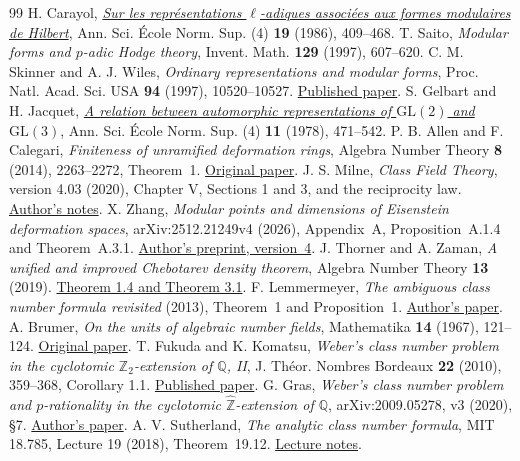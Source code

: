 \documentclass[a4paper,11pt]{article}
\theoremstyle{definition}
\theoremstyle{remark}
\numberwithin{equation}{section}
\begin{document}
\begin{thebibliography}{99}
 H. Carayol, \href{https://www.numdam.org/articles/10.24033/asens.1512/}{\emph{Sur les repr\'esentations \(\ell\)-adiques associ\'ees aux formes modulaires de Hilbert}}, Ann. Sci. \'Ecole Norm. Sup. (4) \textbf{19} (1986), 409--468. T. Saito, \emph{Modular forms and \(p\)-adic Hodge theory}, Invent. Math. \textbf{129} (1997), 607--620.
 C. M. Skinner and A. J. Wiles, \emph{Ordinary representations and modular forms}, Proc. Natl. Acad. Sci. USA \textbf{94} (1997), 10520--10527. \href{https://doi.org/10.1073/pnas.94.20.10520}{Published paper}.
 S. Gelbart and H. Jacquet, \href{https://www.numdam.org/item/ASENS_1978_4_11_4_471_0/}{\emph{A relation between automorphic representations of \(\mathrm{GL}(2)\) and \(\mathrm{GL}(3)\)}}, Ann. Sci. \'Ecole Norm. Sup. (4) \textbf{11} (1978), 471--542.
 P. B. Allen and F. Calegari, \emph{Finiteness of unramified deformation rings}, Algebra Number Theory \textbf{8} (2014), 2263--2272, Theorem~1. \href{https://arxiv.org/abs/1411.3759}{Original paper}.
 J. S. Milne, \emph{Class Field Theory}, version 4.03 (2020), Chapter V, Sections 1 and 3, and the reciprocity law. \href{https://www.jmilne.org/math/CourseNotes/CFT.pdf}{Author's notes}.
 X. Zhang, \emph{Modular points and dimensions of Eisenstein deformation spaces}, arXiv:2512.21249v4 (2026), Appendix~A, Proposition~A.1.4 and Theorem~A.3.1. \href{https://arxiv.org/pdf/2512.21249v4}{Author's preprint, version~4}.
 J. Thorner and A. Zaman, \emph{A unified and improved Chebotarev density theorem}, Algebra Number Theory \textbf{13} (2019). \href{https://msp.org/ant/2019/13-5/ant-v13-n5-p02-p.pdf}{Theorem 1.4 and Theorem 3.1}.
 F. Lemmermeyer, \emph{The ambiguous class number formula revisited} (2013), Theorem~1 and Proposition~1. \href{https://arxiv.org/abs/1309.1071}{Author's paper}.
 A. Brumer, \emph{On the units of algebraic number fields}, Mathematika \textbf{14} (1967), 121--124. \href{https://doi.org/10.1112/S0025579300003703}{Original paper}.
 T. Fukuda and K. Komatsu, \emph{Weber's class number problem in the cyclotomic $\mathbb Z_2$-extension of $\mathbb Q$, II}, J. Th\'eor. Nombres Bordeaux \textbf{22} (2010), 359--368, Corollary 1.1. \href{https://www.numdam.org/article/JTNB_2010__22_2_359_0.pdf}{Published paper}.
 G. Gras, \emph{Weber's class number problem and $p$-rationality in the cyclotomic $\widehat{\mathbb Z}$-extension of $\mathbb Q$}, arXiv:2009.05278, v3 (2020), \S 7. \href{https://arxiv.org/pdf/2009.05278}{Author's paper}.
 A. V. Sutherland, \emph{The analytic class number formula}, MIT 18.785, Lecture 19 (2018), Theorem~19.12. \href{https://math.mit.edu/classes/18.785/2018fa/LectureNotes19.pdf}{Lecture notes}.
\end{thebibliography}\endgroup
\end{document}
